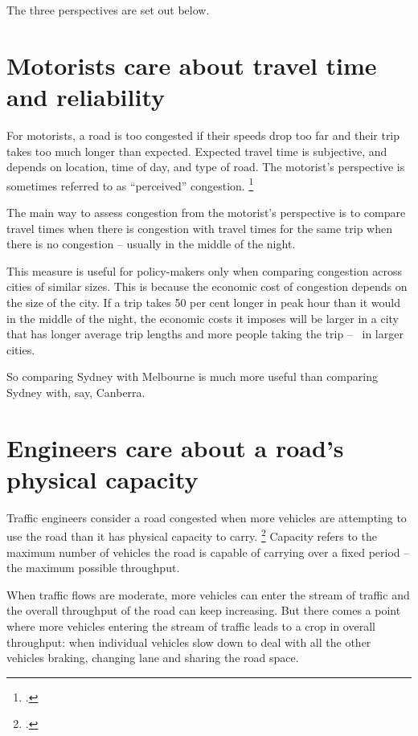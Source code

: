 \label{para:three-perspectives-on-congestion--intro}
The three perspectives are set out below.

\section{Motorists care about travel time and reliability}\label{subsec:road-users-perspective}
For motorists, a road is too congested if their speeds drop too far and their trip takes too much longer than expected. Expected travel time is subjective, and depends on location, time of day, and type of road. The motorist's perspective is sometimes referred to as “perceived” congestion.%
    \footcite[][108]{Falcocchio-and-Levinson-congestion-a-concise-guide}

The main way to assess congestion from the motorist's perspective is to compare travel times when there is congestion with travel times for the same trip when there is no congestion – usually in the middle of the night.

This measure is useful for policy-makers only when comparing congestion across cities of similar sizes.
This is because the economic cost of congestion depends on the size of the city.
If a trip takes 50 per cent longer in peak hour than it would in the middle of the night, the economic costs it imposes will be larger in a city that has longer average trip lengths and more people taking the trip – \ie~in larger cities.

So comparing Sydney with Melbourne is much more useful than comparing Sydney with, say, Canberra.

\section{Engineers care about a road's physical capacity}\label{subsec:engineers-perspective}
Traffic engineers consider a road congested when more vehicles are attempting to use the road than it has physical capacity to carry.%
    \footcite[][7]{Wallis-Lupton-2013-NZ-Transport-Agency}
Capacity refers to the maximum number of vehicles the road is capable of carrying over a fixed period – the maximum possible throughput.

When traffic flows are moderate, more vehicles can enter the stream of traffic and the overall throughput of the road can keep increasing.
But there comes a point where more vehicles entering the stream of traffic leads to a crop in overall throughput: when individual vehicles slow down to deal with all the other vehicles braking, changing lane and sharing the road space.

